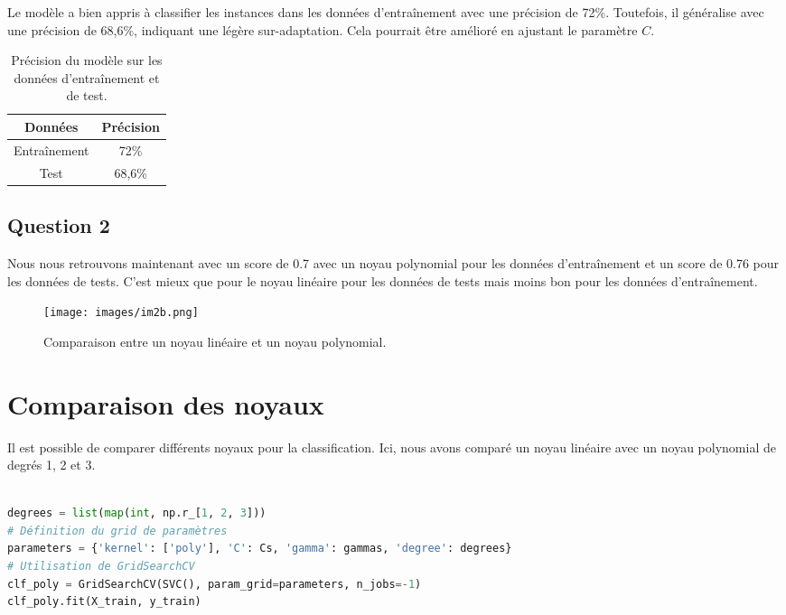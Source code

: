\documentclass[10pt,a4paper]{article}
\begin{document}
Le modèle a bien appris à classifier les instances dans les données d'entraînement avec une précision de 72\%. Toutefois, il généralise avec une précision de 68,6\%, indiquant une légère sur-adaptation. Cela pourrait être amélioré en ajustant le paramètre $C$.

\begin{table}[h!]
    \centering
    \begin{tabular}{|c|c|}
        \hline
        \textbf{Données} & \textbf{Précision} \\
        \hline
        Entraînement & 72\% \\
        \hline
        Test & 68,6\% \\
        \hline
    \end{tabular}
    \caption{Précision du modèle sur les données d'entraînement et de test.}
\end{table}


\medskip
\subsection*{Question 2}
Nous nous retrouvons maintenant avec un score de 0.7 avec un noyau polynomial pour les données d'entraînement et un score de 0.76 pour les données de tests. C'est mieux que pour le noyau linéaire pour les données de tests mais moins bon pour les données d'entraînement.


\begin{figure}[h!]
    \centering
    \texttt{[image: images/im2b.png]}
    \caption{Comparaison entre un noyau linéaire et un noyau polynomial.}
\end{figure}


\section*{  Comparaison des noyaux}

Il est possible de comparer différents noyaux pour la classification. Ici, nous avons comparé un noyau linéaire avec un noyau polynomial de degrés 1, 2 et 3.

\begin{lstlisting}[language=Python, caption=Comparaison des noyaux linéaire et polynomial]

degrees = list(map(int, np.r_[1, 2, 3]))
# Définition du grid de paramètres
parameters = {'kernel': ['poly'], 'C': Cs, 'gamma': gammas, 'degree': degrees}
# Utilisation de GridSearchCV
clf_poly = GridSearchCV(SVC(), param_grid=parameters, n_jobs=-1)
clf_poly.fit(X_train, y_train)
\end{lstlisting}
\end{document}
